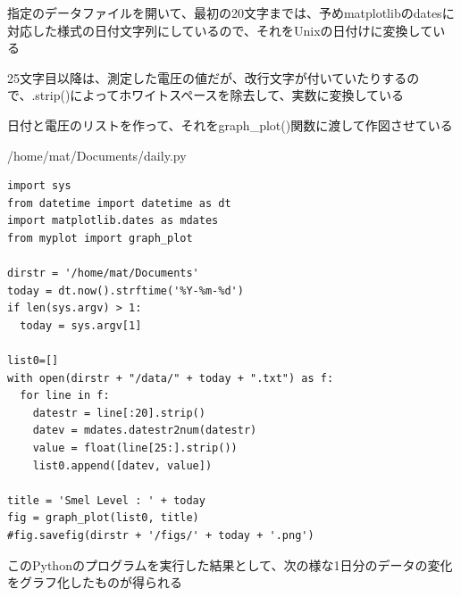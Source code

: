\documentclass[12pt,a4j]{jsbook}
\begin{document}
	指定のデータファイルを開いて、最初の20文字までは、予めmatplotlibのdatesに対応した様式の日付文字列にしているので、それをUnixの日付けに変換している

	25文字目以降は、測定した電圧の値だが、改行文字が付いていたりするので、.strip()によってホワイトスペースを除去して、実数に変換している

	日付と電圧のリストを作って、それをgraph\_plot()関数に渡して作図させている

\begin{spacing}{0.95}
\begin{itembox}[l]{/home/mat/Documents/daily.py}
\begin{verbatim}
import sys
from datetime import datetime as dt
import matplotlib.dates as mdates
from myplot import graph_plot

dirstr = '/home/mat/Documents'
today = dt.now().strftime('%Y-%m-%d')
if len(sys.argv) > 1:
  today = sys.argv[1]

list0=[]
with open(dirstr + "/data/" + today + ".txt") as f:
  for line in f:
    datestr = line[:20].strip()
    datev = mdates.datestr2num(datestr)
    value = float(line[25:].strip())
    list0.append([datev, value])

title = 'Smel Level : ' + today
fig = graph_plot(list0, title)
#fig.savefig(dirstr + '/figs/' + today + '.png')
\end{verbatim}
\end{itembox}
\end{spacing}

\newpage

このPythonのプログラムを実行した結果として、次の様な1日分のデータの変化をグラフ化したものが得られる%
\end{document}
